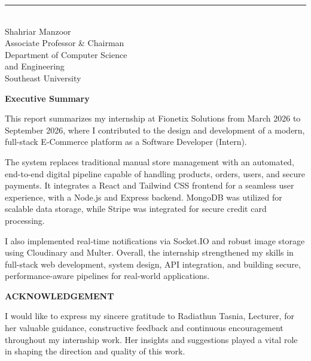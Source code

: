\documentclass[12pt,a4paper]{report}
\begin{document}
\vspace{2.5cm}
\noindent
\begin{minipage}[t]{0.45\textwidth}
\rule{5cm}{0.4pt}\\
Shahriar Manzoor\\
Associate Professor \& Chairman\\
Department of Computer Science\\
and Engineering\\
Southeast University
\end{minipage}

\newpage
{}
\begin{center}
    {\fontsize{14}{16}\selectfont \textbf{Executive Summary}}
\end{center}
\vspace{1cm}

This report summarizes my internship at Fionetix Solutions from March 2026 to September 2026, where I contributed to the design and development of a modern, full-stack E-Commerce platform as a Software Developer (Intern).

The system replaces traditional manual store management with an automated, end-to-end digital pipeline capable of handling products, orders, users, and secure payments. It integrates a React and Tailwind CSS frontend for a seamless user experience, with a Node.js and Express backend. MongoDB was utilized for scalable data storage, while Stripe was integrated for secure credit card processing.

I also implemented real-time notifications via Socket.IO and robust image storage using Cloudinary and Multer. Overall, the internship strengthened my skills in full-stack web development, system design, API integration, and building secure, performance-aware pipelines for real-world applications.

\newpage
{}
\begin{center}
    {\fontsize{14}{16}\selectfont \textbf{ACKNOWLEDGEMENT}}
\end{center}
\vspace{1cm}

I would like to express my sincere gratitude to Radiathun Tasnia, Lecturer, for her valuable guidance, constructive feedback and continuous encouragement throughout my internship work. Her insights and suggestions played a vital role in shaping the direction and quality of this work.
\end{document}

